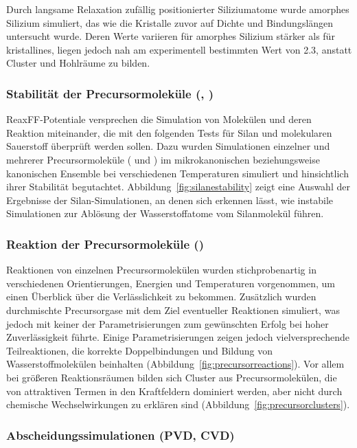 Durch langsame Relaxation zufällig positionierter Siliziumatome wurde amorphes Silizium simuliert, das wie die Kristalle zuvor auf Dichte und Bindungslängen untersucht wurde.
Deren Werte variieren für amorphes Silizium stärker als für kristallines, liegen jedoch nah am experimentell bestimmten Wert von \SI{2.3}{\gpcc}\cite{remes_optical_1998}, anstatt Cluster und Hohlräume zu bilden.

\subsubsection{Stabilität der Precursormoleküle (, )}

ReaxFF-Potentiale versprechen die Simulation von Molekülen und deren Reaktion miteinander, die mit den folgenden Tests für Silan und molekularen Sauerstoff überprüft werden sollen.
Dazu wurden Simulationen einzelner und mehrerer Precursormoleküle ( und ) im mikrokanonischen beziehungsweise kanonischen Ensemble bei verschiedenen Temperaturen simuliert und hinsichtlich ihrer Stabilität begutachtet.
Abbildung~\ref{fig:silanestability} zeigt eine Auswahl der Ergebnisse der Silan-Simulationen, an denen sich erkennen lässt, wie instabile Simulationen zur Ablösung der Wasserstoffatome vom Silanmolekül führen.

\subsubsection{Reaktion der Precursormoleküle ()}

Reaktionen von einzelnen Precursormolekülen wurden stichprobenartig in verschiedenen Orientierungen, Energien und Temperaturen vorgenommen, um einen Überblick über die Verlässlichkeit zu bekommen.
Zusätzlich wurden durchmischte Precursorgase mit dem Ziel eventueller Reaktionen simuliert, was jedoch mit keiner der Parametrisierungen zum gewünschten Erfolg bei hoher Zuverlässigkeit führte.
Einige Parametrisierungen zeigen jedoch vielversprechende Teilreaktionen, die korrekte Doppelbindungen und Bildung von Wasserstoffmolekülen beinhalten (Abbildung~\ref{fig:precursorreactions}).
Vor allem bei größeren Reaktionsräumen bilden sich Cluster aus Precursormolekülen, die von attraktiven Termen in den Kraftfeldern dominiert werden, aber nicht durch chemische Wechselwirkungen zu erklären sind (Abbildung~\ref{fig:precursorclusters}).

\subsubsection{Abscheidungssimulationen (PVD, CVD)}

